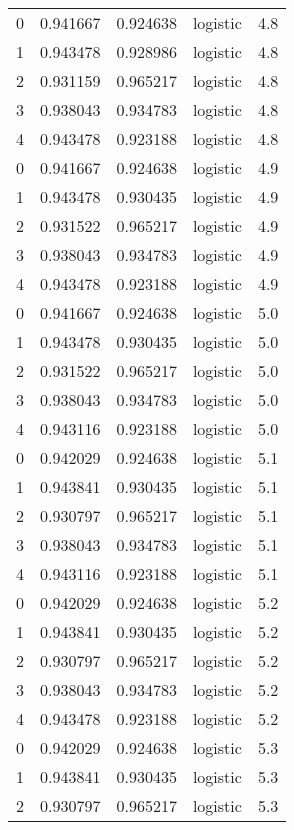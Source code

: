 \begin{tabular}{rrrlr}
     0 & 0.941667 & 0.924638 & logistic &        4.8 \\
     1 & 0.943478 & 0.928986 & logistic &        4.8 \\
     2 & 0.931159 & 0.965217 & logistic &        4.8 \\
     3 & 0.938043 & 0.934783 & logistic &        4.8 \\
     4 & 0.943478 & 0.923188 & logistic &        4.8 \\
     0 & 0.941667 & 0.924638 & logistic &        4.9 \\
     1 & 0.943478 & 0.930435 & logistic &        4.9 \\
     2 & 0.931522 & 0.965217 & logistic &        4.9 \\
     3 & 0.938043 & 0.934783 & logistic &        4.9 \\
     4 & 0.943478 & 0.923188 & logistic &        4.9 \\
     0 & 0.941667 & 0.924638 & logistic &        5.0 \\
     1 & 0.943478 & 0.930435 & logistic &        5.0 \\
     2 & 0.931522 & 0.965217 & logistic &        5.0 \\
     3 & 0.938043 & 0.934783 & logistic &        5.0 \\
     4 & 0.943116 & 0.923188 & logistic &        5.0 \\
     0 & 0.942029 & 0.924638 & logistic &        5.1 \\
     1 & 0.943841 & 0.930435 & logistic &        5.1 \\
     2 & 0.930797 & 0.965217 & logistic &        5.1 \\
     3 & 0.938043 & 0.934783 & logistic &        5.1 \\
     4 & 0.943116 & 0.923188 & logistic &        5.1 \\
     0 & 0.942029 & 0.924638 & logistic &        5.2 \\
     1 & 0.943841 & 0.930435 & logistic &        5.2 \\
     2 & 0.930797 & 0.965217 & logistic &        5.2 \\
     3 & 0.938043 & 0.934783 & logistic &        5.2 \\
     4 & 0.943478 & 0.923188 & logistic &        5.2 \\
     0 & 0.942029 & 0.924638 & logistic &        5.3 \\
     1 & 0.943841 & 0.930435 & logistic &        5.3 \\
     2 & 0.930797 & 0.965217 & logistic &        5.3 \\

\end{tabular}

